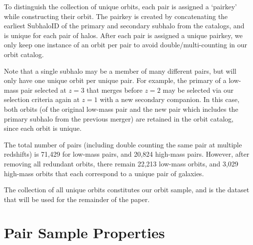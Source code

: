 \documentclass[twocolumn,linenumbers]{aastex631}
\begin{document}
To distinguish the collection of unique orbits, each pair is assigned a `pairkey' while constructing their orbit. 
The pairkey is created by concatenating the earliest SubhaloID of the primary and secondary subhalo from the \sublink{} catalogs, and is unique for each pair of halos. 
After each pair is assigned a unique pairkey, we only keep one instance of an orbit per pair to avoid double/multi-counting in our orbit catalog.

Note that a single subhalo may be a member of many different pairs, but will only have one unique orbit per unique pair.
For example, the primary of a low-mass pair selected at $z=3$ that merges before $z=2$ may be selected via our selection criteria again at $z=1$ with a new secondary companion. 
In this case, both orbits (of the original low-mass pair and the new pair which includes the primary subhalo from the previous merger) are retained in the orbit catalog, since each orbit is unique.

The total number of pairs (including double counting the same pair at multiple redshifts) is 71,429 for low-mass pairs, and 20,824 high-mass pairs. 
However, after removing all redundant orbits, there remain 22,213 low-mass orbits, and 3,029 high-mass orbits that each correspond to a unique pair of galaxies.

The collection of all unique orbits constitutes our orbit sample, and is the dataset that will be used for the remainder of the paper.


\section{Pair Sample Properties}
\end{document}
